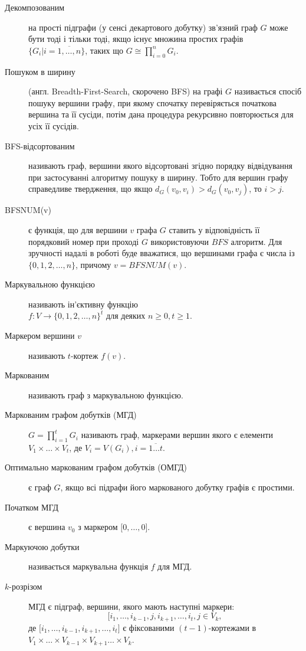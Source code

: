\begin{description}
\item[Декомпозованим] на прості підграфи (у сенсі декартового добутку) зв'язний граф $G$ може бути тоді і тільки тоді, якщо існує множина простих графів $\lbrace G_i \vert i=\overline{1,\dots,n} \rbrace$, таких що $G \cong \displaystyle\prod_{i=0}^n G_i$.
\item[Пошуком в ширину] (англ. Breadth-First-Search, скорочено BFS)  на графі $G$ називається спосіб пошуку вершини графу, при якому спочатку перевіряється початкова вершина та її сусіди, потім дана процедура рекурсивно повторюється для усіх її сусідів.
\item[BFS-відсортованим] називають граф, вершини якого відсортовані згідно порядку відвідування при застосуванні алгоритму пошуку в ширину.
Тобто для вершин графу справедливе твердження, що якщо $d_G(v_0,v_i)>d_G(v_0,v_j)$, то $i>j$.
\item[BFSNUM(v)] є функція, що для вершини $v$ графа $G$ ставить у відповідність її порядковий номер при проході $G$ використовуючи $BFS$ алгоритм.
Для зручності надалі в роботі буде вважатися, що вершинами графа є числа із $\lbrace 0,1,2, \dots, n \rbrace$, причому $v=BFSNUM(v)$.
\item[Маркувальною функцією] називають ін'єктивну функцію\\$f : V\to\lbrace 0,1,2,\dots,n \rbrace^t$ для деяких $n \geq 0, t \geq 1$.
\item[Маркером вершини $v$] називають $t$-кортеж $f(v)$.
\item[Маркованим] називають граф з маркувальною функцією.
\item[Маркованим графом добутків (МГД)] $\displaystyle G=\prod_{i=1}^t G_i$ називають граф, маркерами вершин якого є елементи $V_1 \times \dots \times V_t$, де $V_i = V(G_i), i=\overline{1 \dots t}$.
\item[Оптимально маркованим графом добутків (ОМГД)] є граф $G$, якщо всі підрафи його маркованого добутку графів є простими.
\item[Початком МГД] є вершина $v_0$ з маркером $\lbrack 0,\dots,0 \rbrack$.
\item[Маркуючою добутки] називається маркувальна функція $f$ для МГД.
\item[$k$-розрізом] МГД є підграф, вершини, якого мають наступні маркери:$$\lbrack i_1,\dots,i_{k-1},j,i_{k+1},\dots,i_t,j \in V_k,$$ де $\lbrack i_1,\dots,i_{k-1},i_{k+1},\dots,i_t \rbrack$ є фіксованими $(t-1)$-кортежами в $V_1 \times \dots \times V_{k-1} \times V_{k+1} \dots \times V_k$.

\end{description}
